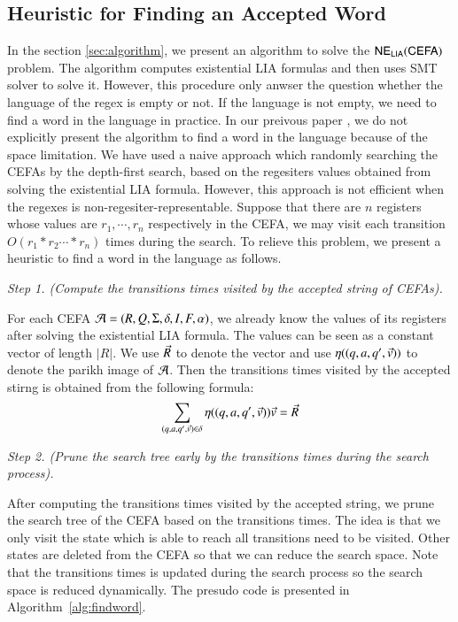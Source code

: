 \subsection{Heuristic for Finding an Accepted Word}
In the section \ref{sec:algorithm}, we present an algorithm to solve the ${\sf NE_{LIA}(CEFA)}$ problem. The algorithm computes existential LIA formulas and then uses SMT solver to solve it. However, this procedure only anwser the question whether the language of the regex is empty or not. If the language is not empty, we need to find a word in the language in practice. In our preivous paper \cite{Denghang2023}, we do not explicitly present the algorithm to find a word in the language because of the space limitation. We have used a naive approach which randomly searching the CEFAs by the depth-first search, based on the regesiters values obtained from solving the existential LIA formula. However, this approach is not efficient when the regexes is non-regesiter-representable. Suppose that there are $n$ registers whose values are $r_1,\cdots, r_n$ respectively in the CEFA, we may visit each transition $O(r_1*r_2\cdots *r_n)$ times during the search. To relieve this problem, we present a heuristic to find a word in the language as follows.

\medskip
\noindent
\emph{Step 1. (Compute the transitions times visited by the accepted string of CEFAs).}

For each CEFA $\mathcal{A} = (R, Q, \Sigma, \delta, I, F, \alpha)$, we already know the values of its registers after solving the existential LIA formula. The values can be seen as a constant vector of length $|R|$. We use $\vec{R}$ to denote the vector and use $\eta((q, a, q', \vec{v}))$ to denote the parikh image of $\mathcal{A}$. Then the transitions times visited by the accepted stirng is obtained from the following formula:
$$ \sum \limits_{(q, a, q', \vec{v})\in \delta} \eta((q, a, q', \vec{v}))\vec{v} = \vec{R}$$

\medskip
\noindent
\emph{Step 2. (Prune the search tree early by the transitions times during the search process).}

After computing the transitions times visited by the accepted string, we prune the search tree of the CEFA based on the transitions times. The idea is that we only visit the state which is able to reach all transitions need to be visited. Other states are deleted from the CEFA so that we can reduce the search space.
Note that the transitions times is updated during the search process so the search space is reduced dynamically. The presudo code is presented in Algorithm~\ref{alg:findword}.

